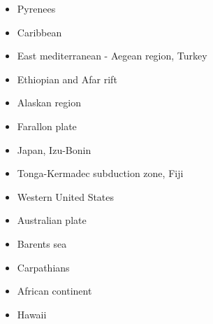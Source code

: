 \begin{itemize}
\item {Pyrenees} 
{\scriptsize
\cite{qubh93}
\cite{giju98}
\cite{bemh00}
\cite{mcmg04}\cite{siss04}
\cite{jaml10}
\cite{vime12}
\cite{fihv13b}
\cite{dual19}
}
\item{Caribbean} 
{\scriptsize
\cite{vago10}
\cite{vags13}
\cite{bovt14}\cite{vagw14}
}
\item{East mediterranean - Aegean region, Turkey} 
{\scriptsize
\cite{cazf10}
}
\item{Ethiopian and Afar rift} 
{\scriptsize
\cite{mitk07}
\cite{cort08}
\cite{kekj09}
\cite{beve10}
\cite{phcs14}
\cite{brcr17}
\cite{brcg17}
\cite{cocf19}
}
\item{Alaskan region} 
{\scriptsize
\cite{jabi12}
\cite{jabr13}
\cite{haja17}
\cite{mimo18}
}
\item{Farallon plate} 
{\scriptsize
\cite{lisg08}
\cite{list11}
\cite{list12}
}
\item{Japan, Izu-Bonin}  
{\scriptsize
\cite{lohd07}\cite{kigk14}\cite{leli14}\cite{kilk15}\cite{yagz17}\cite{yamg19}
}
\item{Tonga-Kermadec subduction zone, Fiji} 
{\scriptsize
\cite{bigs03}\cite{bigu03}
\cite{zhpy06}
}
\item{Western United States}
{\scriptsize
\cite{besb06}
}
\item Australian plate 
{\scriptsize
\cite{himu03}\cite{wemv03}
\cite{hazs10}\cite{dimg10}
\cite{mahg11}\cite{digm11}
\cite{scsp15}
}
\item Barents sea 
{\scriptsize
\cite{buto07b}
\cite{gahs14}
}
\item Carpathians 
{\scriptsize
\cite{clbm04}
\cite{sepg19}
}
\item African continent 
{\scriptsize
\cite{gikb94}
\cite{vabt11}
\cite{busm12}
}
\item Hawaii 

\end{itemize}

